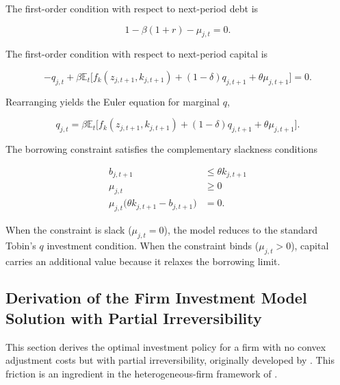 The first-order condition with respect to next-period debt is

\begin{equation}
1 - \beta(1+r) - \mu_{j,t} = 0 .
\end{equation}

The first-order condition with respect to next-period capital is

\begin{equation}
-q_{j,t} + \beta \mathbb{E}_t \Big[
f_k(z_{j,t+1},k_{j,t+1})
+ (1-\delta) q_{j,t+1}
+ \theta \mu_{j,t+1}
\Big] = 0 .
\end{equation}

Rearranging yields the Euler equation for marginal $q$,

\begin{equation}
q_{j,t} =
\beta \mathbb{E}_t \Big[
f_k(z_{j,t+1},k_{j,t+1})
+ (1-\delta) q_{j,t+1}
+ \theta \mu_{j,t+1}
\Big].
\end{equation}

The borrowing constraint satisfies the complementary slackness conditions

\begin{align}
b_{j,t+1} &\le \theta k_{j,t+1} \\
\mu_{j,t} &\ge 0 \\
\mu_{j,t}\big(\theta k_{j,t+1} - b_{j,t+1}\big) &= 0 .
\end{align}

When the constraint is slack ($\mu_{j,t}=0$), the model reduces to the standard
Tobin's $q$ investment condition. When the constraint binds ($\mu_{j,t}>0$),
capital carries an additional value because it relaxes the borrowing limit.

\subsection{Derivation of the Firm Investment Model Solution with Partial Irreversibility \citep{AbelEberly1994, AbelEberly1996}}
\label{app:firm-investment-partial-irreversibility}

This section derives the optimal investment policy for a firm with no convex
adjustment costs but with partial irreversibility, originally developed by
\citet{AbelEberly1994, AbelEberly1996}. This friction is an ingredient in the
heterogeneous-firm framework of \citet{KhanThomas2013}.


